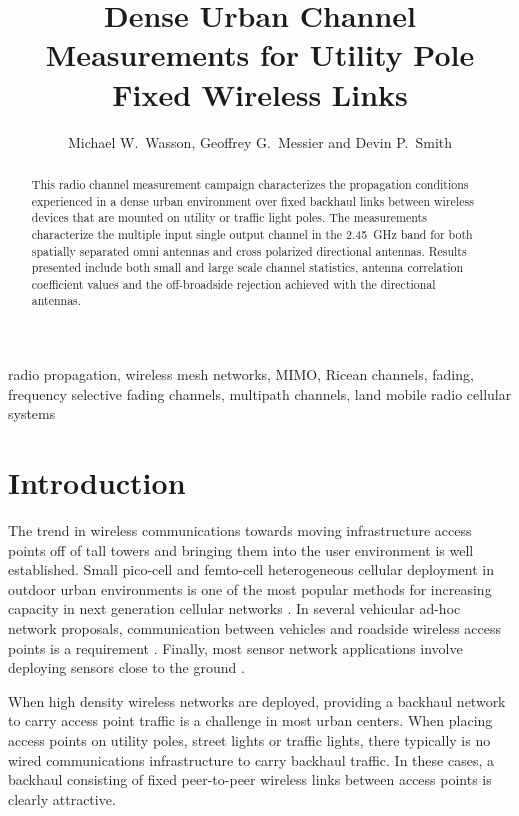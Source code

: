 \documentclass[12pt]{IEEEtran}
\begin{document}
\title{Dense Urban Channel Measurements for Utility Pole Fixed Wireless Links}

\author{Michael W.~Wasson, Geoffrey G.~Messier and Devin P.~Smith}

\maketitle

\thispagestyle{empty}

\begin{abstract}
This radio channel measurement campaign characterizes the propagation conditions experienced in a dense urban environment over fixed backhaul links between wireless devices that are mounted on utility or traffic light poles.  The measurements characterize the  multiple input single output channel in the 2.45~GHz band for both spatially separated omni antennas and cross polarized directional antennas.  Results presented include both small and large scale channel statistics, antenna correlation coefficient values and the off-broadside rejection achieved with the directional antennas.
\end{abstract}

\begin{IEEEkeywords}
radio propagation, wireless mesh networks, MIMO, Ricean channels, fading, frequency selective fading channels, multipath channels, land mobile radio cellular systems
\end{IEEEkeywords}


\IEEEpeerreviewmaketitle

\section{Introduction}

The trend in wireless communications towards moving infrastructure access points off of tall towers and bringing them into the user environment is well established.  Small pico-cell and femto-cell heterogeneous cellular deployment in outdoor urban environments is one of the most popular methods for increasing capacity in next generation cellular networks \cite{ghosh-a-2012}.  In several vehicular ad-hoc network proposals, communication between vehicles and roadside wireless access points is a requirement \cite{hartenstein-h-2008}.  Finally, most sensor network applications involve deploying sensors close to the ground \cite{romer_k1}.

When high density wireless networks are deployed, providing a backhaul network to carry access point traffic is a challenge in most urban centers.  When placing access points on utility poles, street lights or traffic lights, there typically is no wired communications infrastructure to carry backhaul traffic.  In these cases, a backhaul consisting of fixed peer-to-peer wireless links between access points is clearly attractive.
\end{document}
